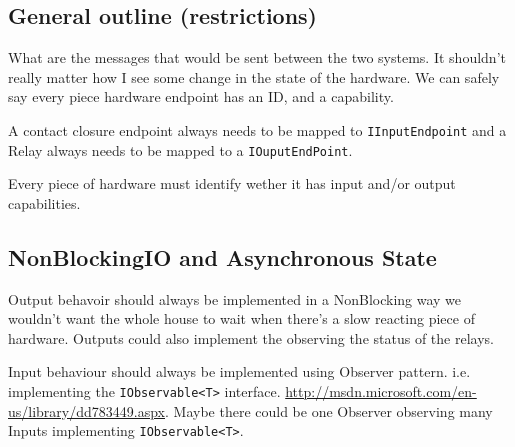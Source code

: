 \documentclass[a4paper]{article}
\begin{document}
\subsection {General outline (restrictions)}
What are the messages that would be sent between the two systems. It shouldn't really matter how I see some change in the state of the hardware. We can safely say every piece hardware endpoint has an ID, and a capability.

A contact closure endpoint always needs to be mapped to \texttt{IInputEndpoint} and a Relay always needs to be mapped to a \texttt{IOuputEndPoint}. 

Every piece of hardware must identify wether it has input and/or output capabilities.

\subsection {NonBlockingIO and Asynchronous State}

Output behavoir should always be implemented in a NonBlocking way we wouldn't want the whole house to wait when there's a slow reacting piece of hardware. Outputs could also implement the  observing the status of the relays.

Input behaviour should always be implemented using Observer pattern. i.e. implementing the \texttt{IObservable<T>} interface. \url{http://msdn.microsoft.com/en-us/library/dd783449.aspx}. Maybe there could be one Observer observing many Inputs implementing \texttt{IObservable<T>}.
\end{document}

